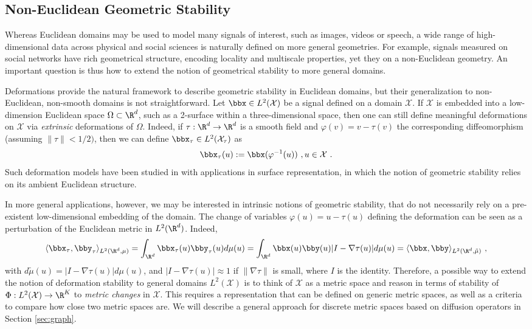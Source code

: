 \subsection{Non-Euclidean Geometric Stability}
\label{sec:noneuclideanstab}

Whereas Euclidean domains may be used to model many signals of interest, such as images, videos or speech, a wide range of high-dimensional data across physical and social sciences is naturally defined on more general geometries. For example, signals measured on social networks have rich geometrical structure, encoding locality and multiscale properties, yet they on a non-Euclidean geometry. An important question is thus how to extend the notion of geometrical stability to more general domains. 

Deformations provide the natural framework to describe geometric stability in Euclidean domains, but their generalization to non-Euclidean, non-smooth 
domains is not straightforward.
Let $\bbx \in L^2(\mathcal{X})$ be a signal defined on a domain $\mathcal{X}$. If $\mathcal{X}$ is embedded into a low-dimension Euclidean space $\Omega \subset \R^d$, such as a 2-surface within a three-dimensional space, then one can still define meaningful deformations on $\mathcal{X}$ via \emph{extrinsic} deformations of $\Omega$. Indeed, if $\tau: \R^d \to \R^d$ is a smooth field and $\varphi(v) = v - \tau(v)$ the corresponding diffeomorphism (assuming $\| \tau\| < 1/2)$, then we can define $\bbx_\tau \in L^2( \mathcal{X}_\tau)$ as
$$\bbx_\tau(u) := \bbx(\varphi^{-1}(u))~,u \in \mathcal{X}~.$$
Such deformation models have been studied in \citep{kostrikov2017surface} with applications in surface representation, in which the notion of geometric stability relies on its ambient Euclidean structure. 

In more general applications, however, we may be interested in intrinsic notions of geometric stability, that do not 
necessarily rely on a pre-existent low-dimensional embedding of the domain. 
The change of variables $\varphi(u) = u - \tau(u)$ defining the deformation can be seen as a perturbation of the Euclidean metric in $L^2(\R^d)$. Indeed, 
\begin{equation} \nonumber
    \langle \bbx_\tau, \bby_\tau \rangle_{L^2(\R^d,\mu)} = \int_{\R^d} \bbx_\tau(u) \bby_\tau(u) d\mu(u) = \int_{\R^d} \bbx(u) \bby(u) | I - \nabla \tau(u)| d\mu(u) = \langle \bbx, \bby \rangle_{L^2(\R^d, \tilde{\mu})}~,
\end{equation}
with $d\tilde{\mu}(u) = | I - \nabla \tau(u)| d\mu(u)$, and $| I - \nabla \tau(u)| \approx 1$ if $\| \nabla \tau \|$ is small, where $I$ is the identity. 
Therefore, a possible way to extend the notion of deformation stability to general domains $L^2(\mathcal{X})$ is 
to think of $\mathcal{X}$ as a metric space and reason in terms of stability of $\Phi: L^2(\mathcal{X}) \to \R^K$
to \emph{metric changes} in $\mathcal{X}$. 
This requires a representation that can be defined on generic metric spaces, as well 
as a criteria to compare how close two metric spaces are. We will describe 
a general approach for discrete metric spaces based on diffusion operators in Section \ref{sec:graph}.

